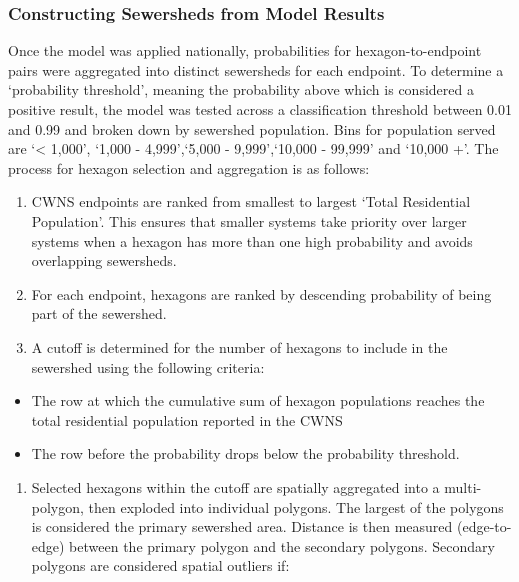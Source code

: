 \documentclass[
  letterpaper,
  DIV=11,
  numbers=noendperiod]{scrartcl}
\providecommand{\tightlist}{%
  \setlength{\itemsep}{0pt}\setlength{\parskip}{0pt}}\usepackage{longtable,booktabs,array}
\begin{document}
\subsubsection{Constructing Sewersheds from Model
Results}\label{constructing-sewersheds-from-model-results}

Once the model was applied nationally, probabilities for
hexagon-to-endpoint pairs were aggregated into distinct sewersheds for
each endpoint. To determine a `probability threshold', meaning the
probability above which is considered a positive result, the model was
tested across a classification threshold between 0.01 and 0.99 and
broken down by sewershed population. Bins for population served are
`\textless{} 1,000', `1,000 - 4,999',`5,000 - 9,999',`10,000 - 99,999'
and `10,000 +'. The process for hexagon selection and aggregation is as
follows:

\begin{enumerate}
\def\labelenumi{\arabic{enumi}.}
\item
  CWNS endpoints are ranked from smallest to largest `Total Residential
  Population'. This ensures that smaller systems take priority over
  larger systems when a hexagon has more than one high probability and
  avoids overlapping sewersheds.
\item
  For each endpoint, hexagons are ranked by descending probability of
  being part of the sewershed.
\item
  A cutoff is determined for the number of hexagons to include in the
  sewershed using the following criteria:
\end{enumerate}

\begin{itemize}
\tightlist
\item
  The row at which the cumulative sum of hexagon populations reaches the
  total residential population reported in the CWNS
\item
  The row before the probability drops below the probability threshold.
\end{itemize}

\begin{enumerate}
\def\labelenumi{\arabic{enumi}.}
\setcounter{enumi}{3}
\tightlist
\item
  Selected hexagons within the cutoff are spatially aggregated into a
  multi-polygon, then exploded into individual polygons. The largest of
  the polygons is considered the primary sewershed area. Distance is
  then measured (edge-to-edge) between the primary polygon and the
  secondary polygons. Secondary polygons are considered spatial outliers
  if:
\end{enumerate}
\end{document}
